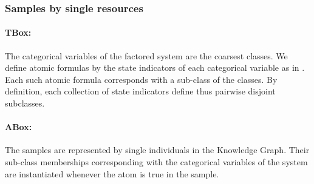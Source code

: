 \subsubsection{Samples by single resources}

\paragraph{TBox:} The categorical variables of the factored system are the coarsest classes.
We define atomic formulas by the state indicators of each categorical variable as in .
Each such atomic formula corresponds with a sub-class of the classes.
By definition, each collection of state indicators define thus pairwise disjoint subclasses.

\paragraph{ABox:} The samples are represented by single individuals in the Knowledge Graph.
Their sub-class memberships corresponding with the categorical variables of the system are instantiated whenever the atom is true in the sample.


